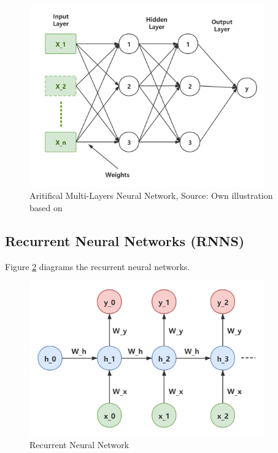\begin{figure}[htbp]
\centering
\includegraphics[width=0.9\textwidth]{./images/multi-layer-ann.png}
\caption{Aritifical Multi-Layers Neural Network, Source: Own illustration based
on\parencite{SAIRAMYA2019253}}
\label{fig:multi-layer-ann}
\end{figure}

\subsection{Recurrent Neural Networks (RNNS)}
Figure \ref{fig:recurrent-layer-ann} diagrams the recurrent neural networks.

\begin{figure}[htbp]
\centering
\includegraphics[width=0.9\textwidth]{./images/recurrent-layer-ann.png}
\caption{Recurrent Neural Network}
\label{fig:recurrent-layer-ann}
\end{figure}

